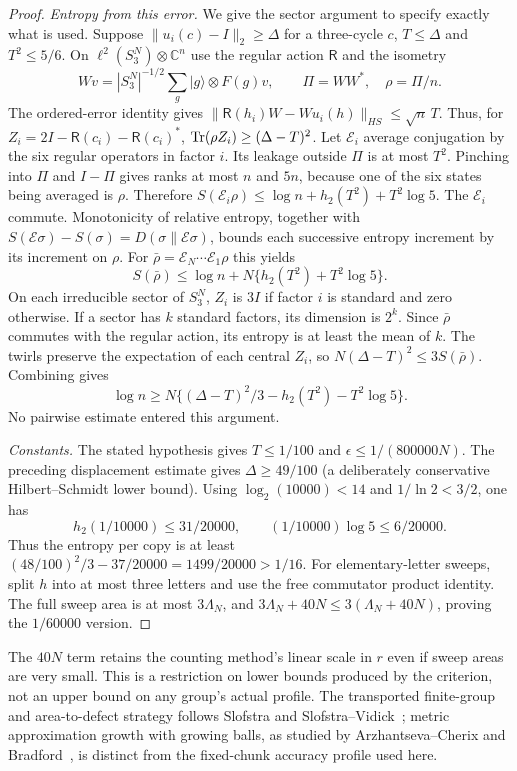 \begin{proof}
\emph{Entropy from this error.} We give the sector argument to specify exactly what is used. Suppose
$\|u_i(c)-I\|_2\ge\Delta$ for a three-cycle $c$, $T\le\Delta$ and $T^2\le5/6$.
On $\ell^2(S_3^N)\otimes\mathbb C^n$ use the regular action $\mathsf R$ and the isometry
\[
 Wv=|S_3^N|^{-1/2}\sum_g|g\rangle\otimes F(g)v,
 \qquad \Pi=WW^*,\quad\rho=\Pi/n.
\]
The ordered-error identity gives $\|\mathsf R(h_i)W-Wu_i(h)\|_{HS}\le\sqrt n\,T$.
Thus, for $Z_i=2I-\mathsf R(c_i)-\mathsf R(c_i)^*$,
$\operatorname{Tr}(\rho Z_i)\ge(\Delta-T)^2$. Let $\mathcal E_i$ average conjugation by the six regular operators in factor $i$.
Its leakage outside $\Pi$ is at most $T^2$. Pinching into $\Pi$ and $I-\Pi$ gives ranks at most $n$ and $5n$, because one of the
six states being averaged is $\rho$. Therefore
$S(\mathcal E_i\rho)\le\log n+h_2(T^2)+T^2\log5$.
The $\mathcal E_i$ commute. Monotonicity of relative entropy, together with
$S(\mathcal E\sigma)-S(\sigma)=D(\sigma\|\mathcal E\sigma)$, bounds each successive entropy increment by its increment on $\rho$.
For $\bar\rho=\mathcal E_N\cdots\mathcal E_1\rho$ this yields
\[
 S(\bar\rho)\le\log n+N\{h_2(T^2)+T^2\log5\}.
\]
On each irreducible sector of $S_3^N$, $Z_i$ is $3I$ if factor $i$ is standard and zero otherwise.
If a sector has $k$ standard factors, its dimension is $2^k$. Since $\bar\rho$ commutes with the regular action, its entropy is
at least the mean of $k$. The twirls preserve the expectation of each central $Z_i$, so
$N(\Delta-T)^2\le3S(\bar\rho)$. Combining gives
\[
 \log n\ge N\{(\Delta-T)^2/3-h_2(T^2)-T^2\log5\}.
\]
No pairwise estimate entered this argument.

\emph{Constants.} The stated hypothesis gives $T\le1/100$ and
$\epsilon\le1/(800000N)$. The preceding displacement estimate gives $\Delta\ge49/100$ (a deliberately conservative
Hilbert--Schmidt lower bound). Using $\log_2(10000)<14$ and $1/\ln2<3/2$, one has
\[
 h_2(1/10000)\le31/20000,\qquad
 (1/10000)\log5\le6/20000.
\]
Thus the entropy per copy is at least
$(48/100)^2/3-37/20000=1499/20000>1/16$.
For elementary-letter sweeps, split $h$ into at most three letters and use the free commutator product identity.
The full sweep area is at most $3\Lambda_N$, and
$3\Lambda_N+40N\le3(\Lambda_N+40N)$, proving the $1/60000$ version.
\end{proof}

The $40N$ term retains the counting method's linear scale in $r$ even if sweep areas are very small. This is a restriction
on lower bounds produced by the criterion, not an upper bound on any group's actual profile.
The transported finite-group and area-to-defect strategy follows Slofstra and Slofstra--Vidick~\cite{Slofstra2018,SlofstraVidick2018};
metric approximation growth with growing balls, as studied by Arzhantseva--Cherix and Bradford~\cite{ArzhantsevaCherix2024,Bradford2021},
is distinct from the fixed-chunk accuracy profile used here.
